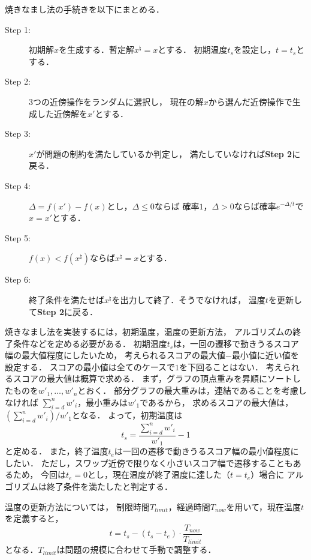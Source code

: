 焼きなまし法の手続きを以下にまとめる．
\begin{description}
  \item[Step 1:] 初期解$x$を生成する．暫定解$x^{\natural}=x$とする．
  初期温度$t_s$を設定し，$t=t_s$とする．
  \item[Step 2:] 3つの近傍操作をランダムに選択し，
  現在の解$x$から選んだ近傍操作で生成した近傍解を$x'$とする．
  \item[Step 3:] $x'$が問題の制約を満たしているか判定し，
  満たしていなければ\textbf{Step 2}に戻る．
  \item[Step 4:] $\Delta=f(x')-f(x)$とし，$\Delta \leq 0$ならば
  確率$1$，$\Delta > 0$ならば確率$e^{-\Delta/t}$で$x=x'$とする．
  \item[Step 5:] $f(x)<f(x^{\natural})$ならば$x^{\natural}=x$とする．
  \item[Step 6:] 終了条件を満たせば$x^{\natural}$を出力して終了．そうでなければ，
  温度$t$を更新して\textbf{Step 2}に戻る．
\end{description}

焼きなまし法を実装するには，初期温度，温度の更新方法，
アルゴリズムの終了条件などを定める必要がある．
初期温度$t_{s}$は，一回の遷移で動きうるスコア幅の最大値程度にしたいため，
考えられるスコアの最大値$-$最小値に近い値を設定する．
スコアの最小値は全てのケースで$1$を下回ることはない．
考えられるスコアの最大値は概算で求める．
まず，グラフの頂点重みを昇順にソートしたものを$w'_1,\ldots,w'_n$とおく．
部分グラフの最大重みは，連結であることを考慮しなければ
$\sum_{i=d}^n w'_i$，最小重みは$w'_1$であるから，
求めるスコアの最大値は，$(\sum_{i=d}^n w'_i)/w'_1$となる．
よって，初期温度は$$t_s=\frac{\sum_{i=d}^n w'_i}{w'_1}- 1$$と定める．
また，終了温度$t_e$は一回の遷移で動きうるスコア幅の最小値程度にしたい．
ただし，スワップ近傍で限りなく小さいスコア幅で遷移することもあるため，
今回は$t_e=0$とし，現在温度が終了温度に達した（$t=t_e$）場合に
アルゴリズムは終了条件を満たしたと判定する．

温度の更新方法については，
制限時間$T_{limit}$，経過時間$T_{now}$を用いて，現在温度$t$を定義すると，
$$t=t_s - (t_s - t_e)\cdot \frac{T_{now}}{T_{limit}}$$
となる．$T_{limit}$は問題の規模に合わせて手動で調整する．

